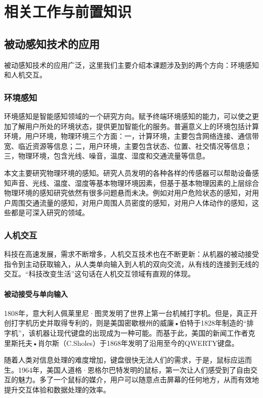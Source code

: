 \chapter{相关工作与前置知识}

\section{被动感知技术的应用}
被动感知技术的应用广泛，这里我们主要介绍本课题涉及到的两个方向：环境感知和人机交互。
\subsection{环境感知}
环境感知是智能感知领域的一个研究方向。赋予终端环境感知的能力，可以使之更加了解用户所处的环境状态，提供更加智能化的服务。普遍意义上的环境包括计算环境，用户环境，物理环境三个方面：一，计算环境，主要包含网络连接、通信带宽、临近资源等信息；二，用户环境，主要包含状态、位置、社交情况等信息；三，物理环境，包含光线、噪音，温度、湿度和交通流量等信息。

本文主要研究物理环境的感知。研究人员发明的各种各样的传感器可以帮助设备感知声音、光线、温度、湿度等基本物理环境因素，但基于基本物理因素的上层综合物理环境的感知研究依然有很多问题悬而未决。例如对用户危险状态的感知，对用户周围交通流量的感知，对用户周围人员密度的感知，对用户人体动作的感知，这些都是可深入研究的领域。

\subsection{人机交互}

科技在高速发展，需求不断增多，人机交互技术也在不断更新：从机器的被动接受指令到主动获取输入，从人类单向输入到人机的双向交流，从有线的连接到无线的交互。“科技改变生活”这句话在人机交互领域有直观的体现。

\subsubsection{被动接受与单向输入}

1808年，意大利人佩莱里尼·图灵发明了世界上第一台机械打字机。但是，真正开创打字机历史并取得专利的，则是美国密歇根州的威廉•伯特于1828年制造的“排字机”，该机器让现代键盘的出现成为一种可能。而基于此，美国的新闻工作者克里斯托夫•肖尔斯（C.Sholes）于1868年发明了沿用至今的QWERTY键盘。

随着人类对信息处理的难度增加，键盘很快无法人们的需求，于是，鼠标应运而生。1964年，美国人道格·恩格尔巴特发明的鼠标，第一次让人们感受到了自由交互的魅力。多了一个鼠标的媒介，用户可以随意点击屏幕的任何地方，从而有效地提升交互体验和数据处理的效率。

